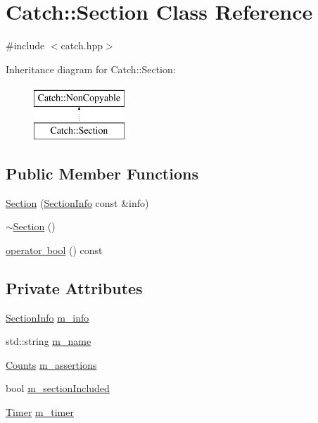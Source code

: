 \hypertarget{class_catch_1_1_section}{}\section{Catch\+::Section Class Reference}
\label{class_catch_1_1_section}


{\ttfamily \#include $<$catch.\+hpp$>$}

Inheritance diagram for Catch\+::Section\+:\begin{figure}[H]
\begin{center}
\leavevmode
\includegraphics[height=2.000000cm]{class_catch_1_1_section}
\end{center}
\end{figure}
\subsection*{Public Member Functions}
\begin{DoxyCompactItemize}
\item 
\mbox{\hyperlink{class_catch_1_1_section_a68fd4e51e8981aaa7ddb00d8a6abd099}{Section}} (\mbox{\hyperlink{struct_catch_1_1_section_info}{Section\+Info}} const \&info)
\item 
\mbox{\hyperlink{class_catch_1_1_section_aa1422edd68a77aa578b5cc6b8b69f86f}{$\sim$\+Section}} ()
\item 
\mbox{\hyperlink{class_catch_1_1_section_a0632b804dcea1417a2970620a9742eb3}{operator bool}} () const
\end{DoxyCompactItemize}
\subsection*{Private Attributes}
\begin{DoxyCompactItemize}
\item 
\mbox{\hyperlink{struct_catch_1_1_section_info}{Section\+Info}} \mbox{\hyperlink{class_catch_1_1_section_a22f54832b33b341ae5a78807a6219af6}{m\+\_\+info}}
\item 
std\+::string \mbox{\hyperlink{class_catch_1_1_section_a29a372077fda582bbd79fb192067f277}{m\+\_\+name}}
\item 
\mbox{\hyperlink{struct_catch_1_1_counts}{Counts}} \mbox{\hyperlink{class_catch_1_1_section_ae0a2acc394d4bd1bc7a51a1445d25034}{m\+\_\+assertions}}
\item 
bool \mbox{\hyperlink{class_catch_1_1_section_a038bb0d5d2718df6e3ae1ece4b3d695d}{m\+\_\+section\+Included}}
\item 
\mbox{\hyperlink{class_catch_1_1_timer}{Timer}} \mbox{\hyperlink{class_catch_1_1_section_a1548993afa64305a1b093391c6884b7e}{m\+\_\+timer}}
\end{DoxyCompactItemize}
